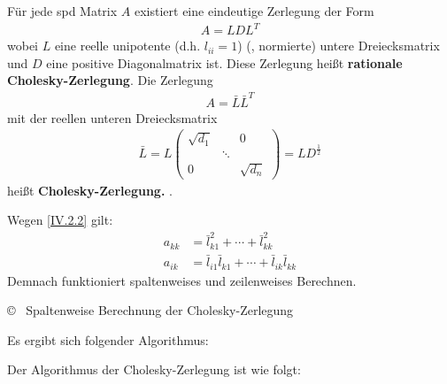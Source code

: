 \begin{Fole}
  \label{4.2.2}
  Für jede spd Matrix $A$ existiert eine eindeutige Zerlegung der Form 
  \begin{gather*}
    A= LDL^T
  \end{gather*}
  wobei $L$ eine reelle unipotente (d.h. $l_{ii}=1$)  (, normierte)  untere 
  Dreiecksmatrix  und $D$ eine positive Diagonalmatrix ist. 
  Diese Zerlegung heißt \textbf{rationale Cholesky-Zerlegung}. Die Zerlegung
  \begin{gather}
    A= \bar{L}\bar{L}^T 
    \label{IV.2.2}
  \end{gather}
  mit der reellen unteren Dreiecksmatrix
  \begin{gather*}
    \bar{L} = L \begin{pmatrix}
      \sqrt{d_1} &&0 \\
      & \ddots & \\
      0&& \sqrt{d_n}
    \end{pmatrix} = LD^{\frac{1}{2}}
  \end{gather*}
  heißt \textbf{Cholesky-Zerlegung.} .
  
  Wegen \eqref{IV.2.2} gilt: 
  \begin{align}
    a_{kk} &= \bar{l}_{k1}^{2} + \dotsb+\bar{l}_{kk}^2 
             \label{IV.2.3} \\
    a_{ik} &= \bar{l}_{i1} \bar{l}_{k1}+\dotsb+\bar{l}_{ik}\bar{l}_{kk}  
             \label{IV.2.4}
  \end{align}
  Demnach funktioniert spaltenweises und zeilenweises Berechnen. 
  
  \begin{image}{\copyright~ Spaltenweise Berechnung der Cholesky-Zerlegung}
  \end{image}{}
\end{Fole}

Es ergibt sich folgender Algorithmus:


Der Algorithmus der Cholesky-Zerlegung ist wie folgt:

